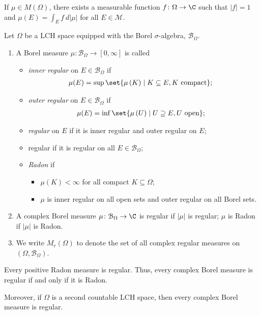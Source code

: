 \begin{fact}
  If $\mu\in M\left(\Omega\right)$, there exists a measurable function $f\colon \Omega\rightarrow \C$ such that $\left\vert f \right\vert = 1$ and $\mu\left(E\right) = \int_{E}^{} f\:d\left\vert \mu \right\vert$ for all $E\in \mathcal{M}$.
\end{fact}
\begin{definition}
  Let $\Omega$ be a LCH space equipped with the Borel $\sigma$-algebra, $\mathcal{B}_{\Omega}$.
  \begin{enumerate}[(1)]
    \item A Borel measure $\mu\colon \mathcal{B}_{\Omega}\rightarrow [0,\infty]$ is called
      \begin{itemize}
        \item \textit{inner regular} on $E\in \mathcal{B}_{\Omega}$ if
          \begin{align*}
            \mu(E) &= \sup\set{\mu\left(K\right)\mid K\subseteq E, K\text{ compact}};
          \end{align*}
        \item \textit{outer regular} on $E\in \mathcal{B}_{\Omega}$ if
          \begin{align*}
            \mu(E) &= \inf\set{\mu\left(U\right)\mid U\supseteq E,U\text{ open}};
          \end{align*}
        \item \textit{regular} on $E$ if it is inner regular and outer regular on $E$;
        \item regular if it is regular on all $E\in \mathcal{B}_{\Omega}$;
        \item \textit{Radon} if
          \begin{itemize}
            \item $\mu(K) < \infty$ for all compact $K\subseteq \Omega$;
            \item $\mu$ is inner regular on all open sets and outer regular on all Borel sets.
          \end{itemize}
      \end{itemize}
    \item A complex Borel measure $\mu\colon \mathcal{B}_{\Omega}\rightarrow \C$ is regular if $\left\vert \mu \right\vert$ is regular; $\mu$ is Radon if $\left\vert \mu \right\vert$ is Radon.
    \item We write $M_{r}\left(\Omega\right)$ to denote the set of all complex regular measures on $\left(\Omega,\mathcal{B}_{\Omega}\right)$.
  \end{enumerate}
\end{definition}
\begin{fact}
  Every positive Radon measure is regular. Thus, every complex Borel measure is regular if and only if it is Radon.\newline

  Moreover, if $\Omega$ is a second countable LCH space, then every complex Borel measure is regular.
\end{fact}


